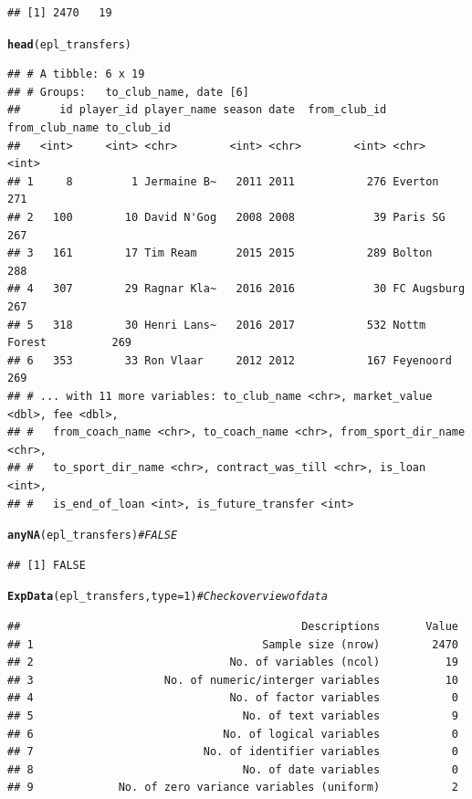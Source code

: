 \documentclass{article}\usepackage[]{graphicx}\usepackage[]{color}
\makeatletter
\newcommand{\hlnum}[1]{\textcolor[rgb]{0.686,0.059,0.569}{#1}}%
\newcommand{\hlcom}[1]{\textcolor[rgb]{0.678,0.584,0.686}{\textit{#1}}}%
\newcommand{\hlstd}[1]{\textcolor[rgb]{0.345,0.345,0.345}{#1}}%
\newcommand{\hlkwc}[1]{\textcolor[rgb]{0.333,0.667,0.333}{#1}}%
\newcommand{\hlkwd}[1]{\textcolor[rgb]{0.737,0.353,0.396}{\textbf{#1}}}%
\newenvironment{kframe}{%
 \def\at@end@of@kframe{}%
 \ifinner\ifhmode%
  \def\at@end@of@kframe{\end{minipage}}%
  \begin{minipage}{\columnwidth}%
 \fi\fi%
 \def\FrameCommand##1{\hskip\@totalleftmargin \hskip-\fboxsep
 \colorbox{shadecolor}{##1}\hskip-\fboxsep
     \hskip-\linewidth \hskip-\@totalleftmargin \hskip\columnwidth}%
 \MakeFramed {\advance\hsize-\width
   \@totalleftmargin\z@ \linewidth\hsize
   \@setminipage}}%
 {\par\unskip\endMakeFramed%
 \at@end@of@kframe}
\newenvironment{knitrout}{}{} %
\makeatother
\begin{document}
\begin{knitrout}
\begin{kframe}
\begin{verbatim}
## [1] 2470   19
\end{verbatim}
\begin{alltt}
\hlkwd{head}\hlstd{(epl_transfers)}
\end{alltt}
\begin{verbatim}
## # A tibble: 6 x 19
## # Groups:   to_club_name, date [6]
##      id player_id player_name season date  from_club_id from_club_name to_club_id
##   <int>     <int> <chr>        <int> <chr>        <int> <chr>               <int>
## 1     8         1 Jermaine B~   2011 2011           276 Everton               271
## 2   100        10 David N'Gog   2008 2008            39 Paris SG              267
## 3   161        17 Tim Ream      2015 2015           289 Bolton                288
## 4   307        29 Ragnar Kla~   2016 2016            30 FC Augsburg           267
## 5   318        30 Henri Lans~   2016 2017           532 Nottm Forest          269
## 6   353        33 Ron Vlaar     2012 2012           167 Feyenoord             269
## # ... with 11 more variables: to_club_name <chr>, market_value <dbl>, fee <dbl>,
## #   from_coach_name <chr>, to_coach_name <chr>, from_sport_dir_name <chr>,
## #   to_sport_dir_name <chr>, contract_was_till <chr>, is_loan <int>,
## #   is_end_of_loan <int>, is_future_transfer <int>
\end{verbatim}
\begin{alltt}
\hlkwd{anyNA}\hlstd{(epl_transfers)} \hlcom{# FALSE}
\end{alltt}
\begin{verbatim}
## [1] FALSE
\end{verbatim}
\begin{alltt}
\hlkwd{ExpData}\hlstd{(epl_transfers,} \hlkwc{type}\hlstd{=}\hlnum{1}\hlstd{)} \hlcom{# Check overview of data}
\end{alltt}
\begin{verbatim}
##                                           Descriptions       Value
## 1                                   Sample size (nrow)        2470
## 2                              No. of variables (ncol)          19
## 3                    No. of numeric/interger variables          10
## 4                              No. of factor variables           0
## 5                                No. of text variables           9
## 6                             No. of logical variables           0
## 7                          No. of identifier variables           0
## 8                                No. of date variables           0
## 9             No. of zero variance variables (uniform)           2

\end{verbatim}
\end{kframe}
\end{knitrout}
\end{document}
